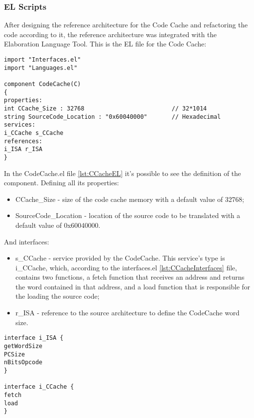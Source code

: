 \subsubsection{EL Scripts}

After designing the reference architecture for the Code Cache and refactoring the code according to it, the reference architecture was integrated with the Elaboration Language Tool. This is the EL file for the Code Cache:

\begin{lstlisting}[caption={Code Cache EL file}, label={lst:CCacheEL},language=EL]
import "Interfaces.el"
import "Languages.el"

component CodeCache(C)
{
properties:
int CCache_Size : 32768							// 32*1014
string SourceCode_Location : "0x60040000"		// Hexadecimal
services:
i_CCache s_CCache
references:
i_ISA r_ISA
}
\end{lstlisting}

In the CodeCache.el file \ref{lst:CCacheEL} it's possible to see the definition of the component. Defining all its properties:
\begin{itemize}
	\item 	CCache\_Size - size of the code cache memory with a default value of 32768;
	\item	SourceCode\_Location - location of the source code to be translated with a default value of 0x60040000.
\end{itemize}
And interfaces:
\begin{itemize}
	\item 	s\_CCache - service provided by the CodeCache. This service's type is i\_CCache, which, according to the interfaces.el \ref{lst:CCacheInterfaces} file, contains two functions, a fetch function that receives an address and returns the word contained in that address, and a load function that is responsible for the loading the source code;
	\item	r\_ISA - reference to the source architecture to define the CodeCache word size.
\end{itemize}

\begin{lstlisting}[caption={Code Cache Interfaces EL file}, label={lst:CCacheInterfaces},language=EL]
interface i_ISA {
getWordSize
PCSize
nBitsOpcode
}

interface i_CCache {
fetch
load
}
\end{lstlisting}






